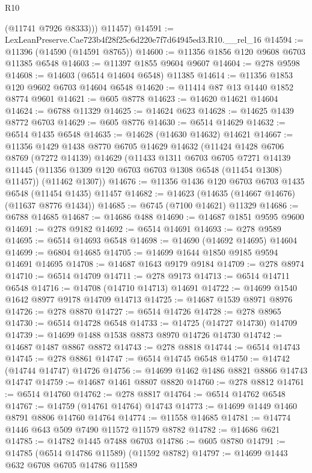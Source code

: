 \begin{lexlean}{R10}
\begin{coremodule}
          (@11741 @7926 @8333)))
      @11457)
@14591 := LexLeanPreserve.Cae723b4f28f25c6d220e7f7d64945ed3.R10.__rel_16
@14594 := @11396 (@14590 (@14591 @8765))
@14600 := @11356 @1856 @120 @9608 @6703 @11385 @6548
@14603 := @11397 @1855 @9604 @9607
@14604 := @278 @9598
@14608 := @14603 (@6514 @14604 @6548) @11385
@14614 := @11356 @1853 @120 @9602 @6703 @14604 @6548
@14620 := @11414 @87 @13 @1440 @1852 @8774 @9601
@14621 := @605 @8778
@14623 := @14620 @14621 @14604
@14624 := @6788 @11329
@14625 := @14624 @623
@14628 := @14625 @1439 @8772 @6703
@14629 := @605 @8776
@14630 := @6514 @14629
@14632 := @6514 @1435 @6548
@14635 := @14628 (@14630 @14632) @14621
@14667 := @11356
    @1429
    @1438
    @8770
    @6705
    @14629
    @14632
    (@11424
      @1428
      @6706
      @8769
      (@7272 @14139)
      @14629
      (@11433
        @1311
        @6703
        @6705
        @7271
        @14139
        @11445
        (@11356 @1309 @120 @6703 @6703 @1308 @6548 (@11454 @1308) @11457))
      (@11462 @1307))
@14676 := @11356 @1436 @120 @6703 @6703 @1435 @6548 (@11454 @1435) @11457
@14682 := @14623 (@14635 (@14667 @14676) (@11637 @8776 @1434))
@14685 := @6745 (@7100 @14621) @11329
@14686 := @6788 @14685
@14687 := @14686 @488
@14690 := @14687 @1851 @9595 @9600
@14691 := @278 @9182
@14692 := @6514 @14691
@14693 := @278 @9589
@14695 := @6514 @14693 @6548
@14698 := @14690 (@14692 @14695) @14604
@14699 := @6804 @14685
@14705 := @14699 @1644 @1850 @9185 @9594 @14691 @14695
@14708 := @14687 @1643 @9179 @9184
@14709 := @278 @8974
@14710 := @6514 @14709
@14711 := @278 @9173
@14713 := @6514 @14711 @6548
@14716 := @14708 (@14710 @14713) @14691
@14722 := @14699 @1540 @1642 @8977 @9178 @14709 @14713
@14725 := @14687 @1539 @8971 @8976
@14726 := @278 @8870
@14727 := @6514 @14726
@14728 := @278 @8965
@14730 := @6514 @14728 @6548
@14733 := @14725 (@14727 @14730) @14709
@14739 := @14699 @1488 @1538 @8873 @8970 @14726 @14730
@14742 := @14687 @1487 @8867 @8872
@14743 := @278 @8818
@14744 := @6514 @14743
@14745 := @278 @8861
@14747 := @6514 @14745 @6548
@14750 := @14742 (@14744 @14747) @14726
@14756 := @14699 @1462 @1486 @8821 @8866 @14743 @14747
@14759 := @14687 @1461 @8807 @8820
@14760 := @278 @8812
@14761 := @6514 @14760
@14762 := @278 @8817
@14764 := @6514 @14762 @6548
@14767 := @14759 (@14761 @14764) @14743
@14773 := @14699 @1449 @1460 @8791 @8806 @14760 @14764
@14774 := @11558 @14685
@14781 := @14774 @1446 @643 @509 @7490 @11572 @11579 @8782
@14782 := @14686 @621
@14785 := @14782 @1445 @7488 @6703
@14786 := @605 @8780
@14791 := @14785 (@6514 @14786 @11589) (@11592 @8782)
@14797 := @14699 @1443 @632 @6708 @6705 @14786 @11589

\end{coremodule}
\end{lexlean}
